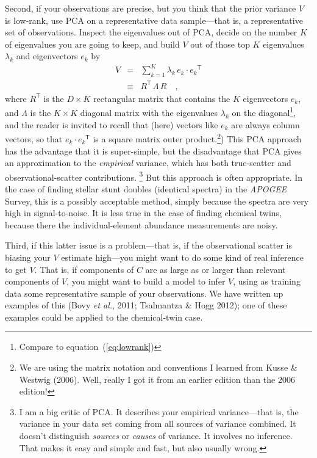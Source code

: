 \documentclass[12pt,letterpaper]{article}
\newcommand{\foreign}[1]{\textsl{#1}}
\newcommand{\project}[1]{\textsl{#1}}
\newcommand{\acronym}[1]{{\small{#1}}}
\newcommand{\equationname}{equation}
\newcommand{\etal}{\foreign{et al.}}
\newcommand{\tra}[1]{{#1}^{\mathsf{T}}}
\begin{document}
Second, if your observations are precise, but you think that the prior
variance $V$ is low-rank, use \acronym{PCA} on a representative data
sample---that is, a representative set of observations. Inspect the
eigenvalues out of \acronym{PCA}, decide on the number $K$ of eigenvalues
you are going to keep, and build
$V$ out of those top $K$ eigenvalues $\lambda_k$ and eigenvectors $e_k$ by
\begin{eqnarray}
  V &=& \sum_{k=1}^K \lambda_k\,e_k\cdot\tra{e_k}
\\
    &\equiv& \tra{R}\,\Lambda\,R
\quad ,
\end{eqnarray}
where $\tra{R}$ is the $D\times K$ rectangular matrix that contains
the $K$ eigenvectors $e_k$, and $\Lambda$ is the $K\times K$ diagonal matrix
with the eigenvalues $\lambda_k$ on the diagonal\footnote{%
  Compare to \equationname~(\ref{eq:lowrank})},
and the reader is invited to recall
that (here) vectors like $e_k$ are always column vectors, so that
$e_k\cdot\tra{e_k}$ is a square matrix outer product.\footnote{We
  are using the matrix notation and conventions I learned from Kusse
  \& Westwig (2006). Well, really I got it from an earlier edition than the 2006 edition!})
This \acronym{PCA} approach
has the advantage that it is super-simple, but the disadvantage
that \acronym{PCA} gives an approximation to the \emph{empirical} variance, which
has both true-scatter and observational-scatter contributions.%
\footnote{I am a big critic of \acronym{PCA}. It describes your
  empirical variance---that is, the variance in your data set coming
  from all sources of variance combined. It doesn't distinguish
  \emph{sources} or \emph{causes} of variance. It involves no
  inference. That makes it easy and simple and fast, but also usually
  wrong.}
But this approach is often
appropriate. In the case of finding stellar stunt doubles (identical
spectra) in the \project{\acronym{APOGEE}} Survey, this is a possibly acceptable
method, simply because the spectra are very high in
signal-to-noise. It is less true in the case of finding chemical
twins, because there the individual-element abundance measurements are
noisy.

Third, if this latter issue is a problem---that is, if the
observational scatter is biasing your $V$ estimate high---you might
want to do some kind of real inference to get $V$. That is, if
components of $C$ are as large as or larger than relevant components
of $V$, you might want to build a model to infer $V$, using as
training data some representative sample of your observations. We have
written up examples of this (Bovy \etal, 2011; Tsalmantza \& Hogg 2012);
one of these examples could be applied to the chemical-twin case.
\end{document}
